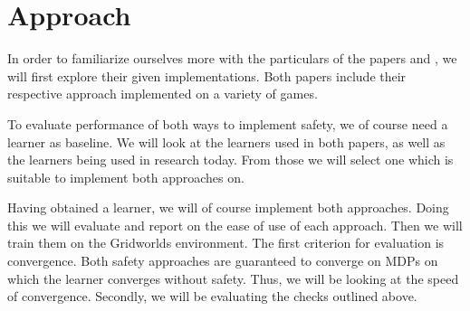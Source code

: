 \documentclass[a4paper,kul]{kulakarticle}
\begin{document}
\section{Approach}
In order to familiarize ourselves more with the particulars of the papers 
\cite{alshiekh2018safe} and \cite{de2019foundations}, we will first explore 
their given implementations. Both papers include their respective approach 
implemented on a variety of games.
\par To evaluate performance of both ways to implement safety, we of course need a learner as baseline. We will look at the learners used in both papers, as well as the learners being used in research today. From those we will select one which is suitable to implement both approaches on.
\par Having obtained a learner, we will of course implement both approaches. Doing this we will evaluate and report on the ease of use of each approach. Then we will train them on the Gridworlds environment. The first criterion for evaluation is convergence. Both safety approaches are guaranteed to converge on MDPs on which the learner converges without safety. Thus, we will be looking at the speed of convergence. Secondly, we will be evaluating the checks outlined above.

 

\end{document}
